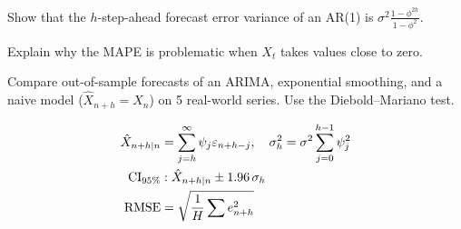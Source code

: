 \begin{exercise}[$\star\star$]
Show that the $h$-step-ahead forecast error variance of an AR(1) is $\sigma^2\frac{1-\phi^{2h}}{1-\phi^2}$.
\end{exercise}

\begin{exercise}[$\star\star$]
Explain why the MAPE is problematic when $X_t$ takes values close to zero.
\end{exercise}

\begin{exercise}
Compare out-of-sample forecasts of an ARIMA, exponential smoothing, and a naive model ($\hat{X}_{n+h}=X_n$) on 5 real-world series. Use the Diebold--Mariano test.
\end{exercise}

\begin{keyformulas}
\begin{align*}
\hat{X}_{n+h|n} &= \sum_{j=h}^{\infty}\psi_j\varepsilon_{n+h-j}, \quad \sigma_h^2=\sigma^2\sum_{j=0}^{h-1}\psi_j^2 \\
\text{CI}_{95\%} &: \hat{X}_{n+h|n}\pm 1.96\,\sigma_h \\
\text{RMSE} &= \sqrt{\frac{1}{H}\sum e_{n+h}^2}
\end{align*}
\end{keyformulas}
